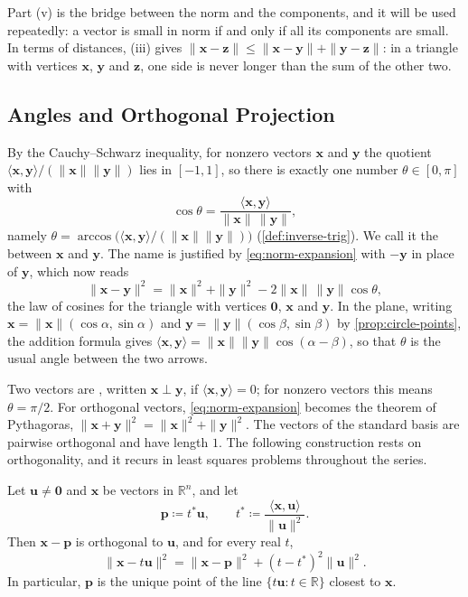 Part (v) is the bridge between the norm and the components, and it will be used repeatedly: a vector is small in norm if and only if all its components are small. In terms of distances, (iii) gives $\|\mathbf x-\mathbf z\|\le\|\mathbf x-\mathbf y\|+\|\mathbf y-\mathbf z\|$: in a triangle with vertices $\mathbf x$, $\mathbf y$ and $\mathbf z$, one side is never longer than the sum of the other two.

\subsection{Angles and Orthogonal Projection}

By the Cauchy--Schwarz inequality, for nonzero vectors $\mathbf x$ and $\mathbf y$ the quotient $\langle\mathbf x,\mathbf y\rangle/(\|\mathbf x\|\|\mathbf y\|)$ lies in $[-1,1]$, so there is exactly one number $\theta\in[0,\pi]$ with
\begin{equation}
\cos\theta=\frac{\langle\mathbf x,\mathbf y\rangle}{\|\mathbf x\|\,\|\mathbf y\|},
\label{eq:angle}
\end{equation}
namely $\theta=\arccos\bigl(\langle\mathbf x,\mathbf y\rangle/(\|\mathbf x\|\|\mathbf y\|)\bigr)$ (\cref{def:inverse-trig}). We call it the  between $\mathbf x$ and $\mathbf y$. The name is justified by \eqref{eq:norm-expansion} with $-\mathbf y$ in place of $\mathbf y$, which now reads
\[
\|\mathbf x-\mathbf y\|^2=\|\mathbf x\|^2+\|\mathbf y\|^2-2\|\mathbf x\|\,\|\mathbf y\|\cos\theta ,
\]
the law of cosines for the triangle with vertices $\mathbf 0$, $\mathbf x$ and $\mathbf y$. In the plane, writing $\mathbf x=\|\mathbf x\|(\cos\alpha,\sin\alpha)$ and $\mathbf y=\|\mathbf y\|(\cos\beta,\sin\beta)$ by \cref{prop:circle-points}, the addition formula gives $\langle\mathbf x,\mathbf y\rangle=\|\mathbf x\|\|\mathbf y\|\cos(\alpha-\beta)$, so that $\theta$ is the usual angle between the two arrows.

Two vectors are , written $\mathbf x\perp\mathbf y$, if $\langle\mathbf x,\mathbf y\rangle=0$; for nonzero vectors this means $\theta=\pi/2$. For orthogonal vectors, \eqref{eq:norm-expansion} becomes the theorem of Pythagoras, $\|\mathbf x+\mathbf y\|^2=\|\mathbf x\|^2+\|\mathbf y\|^2$. The vectors of the standard basis are pairwise orthogonal and have length $1$. The following construction rests on orthogonality, and it recurs in least squares problems throughout the series.

\begin{proposition}
\label{prop:projection-line}
Let $\mathbf u\ne\mathbf 0$ and $\mathbf x$ be vectors in $\mathbb R^n$, and let
\[
\mathbf p\coloneqq t^*\mathbf u,\qquad t^*\coloneqq\frac{\langle\mathbf x,\mathbf u\rangle}{\|\mathbf u\|^2}.
\]
Then $\mathbf x-\mathbf p$ is orthogonal to $\mathbf u$, and for every real $t$,
\[
\|\mathbf x-t\mathbf u\|^2=\|\mathbf x-\mathbf p\|^2+(t-t^*)^2\|\mathbf u\|^2 .
\]
In particular, $\mathbf p$ is the unique point of the line $\{t\mathbf u: t\in\mathbb R\}$ closest to $\mathbf x$.
\end{proposition}

